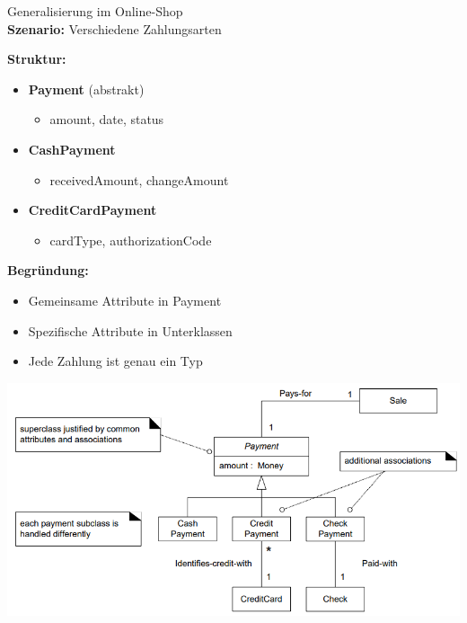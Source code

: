 \begin{example2}{Generalisierung im Online-Shop}\\
\textbf{Szenario:} Verschiedene Zahlungsarten

\textbf{Struktur:}
\begin{itemize}
    \item \textbf{Payment} (abstrakt)
    \begin{itemize}
        \item amount, date, status
    \end{itemize}
    \item \textbf{CashPayment}
    \begin{itemize}
        \item receivedAmount, changeAmount
    \end{itemize}
    \item \textbf{CreditCardPayment}
    \begin{itemize}
        \item cardType, authorizationCode
    \end{itemize}
\end{itemize}

\textbf{Begründung:}
\begin{itemize}
    \item Gemeinsame Attribute in Payment
    \item Spezifische Attribute in Unterklassen
    \item Jede Zahlung ist genau ein Typ
\end{itemize}
\includegraphics[width=\linewidth]{images/generalisierung_extended.png}
\end{example2}

